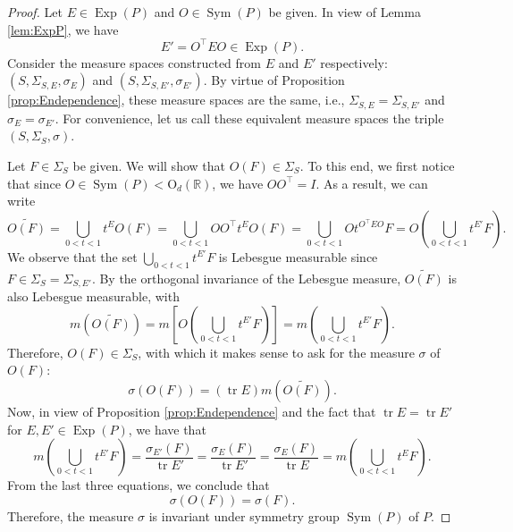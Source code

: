 \documentclass[11pt]{article}
\theoremstyle{theorem}
\newcommand\OdR{\mbox{O}_d(\mathbb{R})}
\newcommand\Sym{\operatorname{Sym}}
\newcommand\Exp{\operatorname{Exp}}
\newcommand\tr{\operatorname{tr}}
\newcommand{\lp}{\left(}
\newcommand{\rp}{\right)}
\newcommand{\lb}{\left[}
\newcommand{\rb}{\right]}
\begin{document}
\begin{proof}
Let $E\in \Exp(P)$ and $O\in \Sym(P)$ be given. In view of Lemma \ref{lem:ExpP}, we have 
\begin{equation*}
    E' = O^\top E O \in \Exp(P).
\end{equation*}
Consider the measure spaces constructed from $E$ and $E'$ respectively: $(S, \Sigma_{S,E},\sigma_E)$ and $(S,\Sigma_{S,E'},\sigma_{E'})$. By virtue of Proposition \ref{prop:Endependence}, these measure spaces are the same, i.e., $\Sigma_{S,E} = \Sigma_{S,E'}$ and $\sigma_{E} = \sigma_{E'}$. For convenience, let us call these equivalent measure spaces the triple $(S,\Sigma_S,\sigma)$. 

Let $F\in \Sigma_S$ be given. We will show that $O(F)\in \Sigma_S$. To this end, we first notice that since $O\in \Sym(P) < \OdR$, we have $O O^\top = I$. As a result, we can write
\begin{equation*}
    \widetilde{O(F)} = \bigcup_{0<t<1}t^E O(F) = \bigcup_{0<t<1} O O^\top t^E O(F) = \bigcup_{0<t<1}O t^{O^\top E O} F = O\lp \bigcup_{0<t<1}t^{E'} F\rp.
\end{equation*}
We observe that the set $\bigcup_{0<t<1} t^{E'}F$ is Lebesgue measurable since $F\in \Sigma_S = \Sigma_{S,E'}$. By the orthogonal invariance of the Lebesgue measure, $\widetilde{O(F)}$ is also Lebesgue measurable, with
\begin{equation*}
    m (\widetilde{O(F)} ) = m\lb O \lp \bigcup_{0<t<1}t^{E'}F \rp \rb =  m\lp \bigcup_{0<t<1}t^{E'}F \rp.
\end{equation*}
Therefore, $O(F)\in \Sigma_S$, with which it makes sense to ask for the measure $\sigma$ of $O(F)$:
\begin{equation*}
    \sigma(O(F)) = (\tr E)m(\widetilde{O(F)}).
\end{equation*}
Now, in view of Proposition \ref{prop:Endependence} and the fact that $\tr E = \tr E'$ for $E,E'\in \Exp(P)$, we have that
\begin{equation*}
    m\lp \bigcup_{0<t<1}t^{E'}F \rp = \frac{\sigma_{E'}(F)}{\tr E' }  
    = 
    \frac{\sigma_E(F)}{\tr E'} =  \frac{\sigma_E(F)}{\tr E}   = m\lp \bigcup_{0<t<1} t^E F  \rp.
\end{equation*}
From the last three equations, we conclude that 
\begin{equation*}
    \sigma(O(F)) = \sigma(F).
\end{equation*}
Therefore, the measure $\sigma$ is invariant under symmetry group $\Sym(P)$ of $P$.  
\end{proof}
\end{document}
